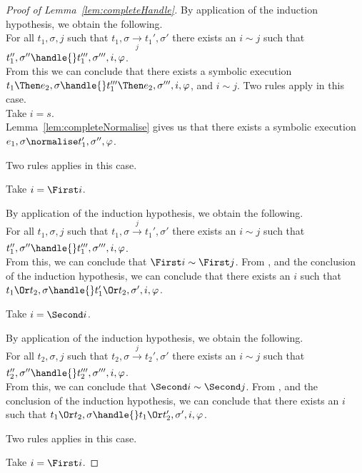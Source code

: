 \begin{proof}[Proof of Lemma~\ref{lem:completeHandle}]
{  By application of the induction hypothesis, we obtain the following.\\
  For all $t_1,\sigma,j$ such that $t_1,\sigma\xrightarrow[j]{}t_1',\sigma'$ there exists an $i\sim j$ such that $t_1'',\sigma''\handle{}t_1''',\sigma''',i,\phi$.\\
  From this we can conclude that there exists a symbolic execution $t_1\Then e_2,\sigma\handle{} t_1'''\Then e_2,\sigma''',i,\phi$, and $i\sim j$.
  }
  {
  Two rules apply in this case.\\
    {
      Take $i=s$.\\
      Lemma~\ref{lem:completeNormalise} gives us that there exists a symbolic execution $e_1,\sigma\normalise t_1',\sigma'',\phi$.\\
    }
    {
    }
  }
    {
    Two rules applies in this case.\\
    {
    Take $i=\First i$.

    By application of the induction hypothesis, we obtain the following.\\
    For all $t_1,\sigma,j$ such that $t_1,\sigma\xrightarrow[]{j}t_1',\sigma'$ there exists an $i\sim j$ such that $t_1'',\sigma''\handle{}t_1''',\sigma''',i,\phi$.\\

    From this, we can conclude that $\First i\sim \First j$.
    From , and the conclusion of the induction hypothesis,
    we can conclude that there exists an $i$ such that $t_1\Or t_2,\sigma\handle{}t_1'\Or t_2,\sigma',i,\phi$.
    }
    {
    Take $i=\Second i$.

    By application of the induction hypothesis, we obtain the following.\\
    For all $t_2,\sigma,j$ such that $t_2,\sigma\xrightarrow[]{j}t_2',\sigma'$ there exists an $i\sim j$ such that $t_2'',\sigma''\handle{}t_2''',\sigma''',i,\phi$.\\

    From this, we can conclude that $\Second i\sim \Second j$.
    From , and the conclusion of the induction hypothesis,
    we can conclude that there exists an $i$ such that $t_1\Or t_2,\sigma\handle{}t_1\Or t_2',\sigma',i,\phi$.
    }
    }
    {
    Two rules applies in this case.\\
    {
    Take $i=\First i$.

}}
\end{proof}
